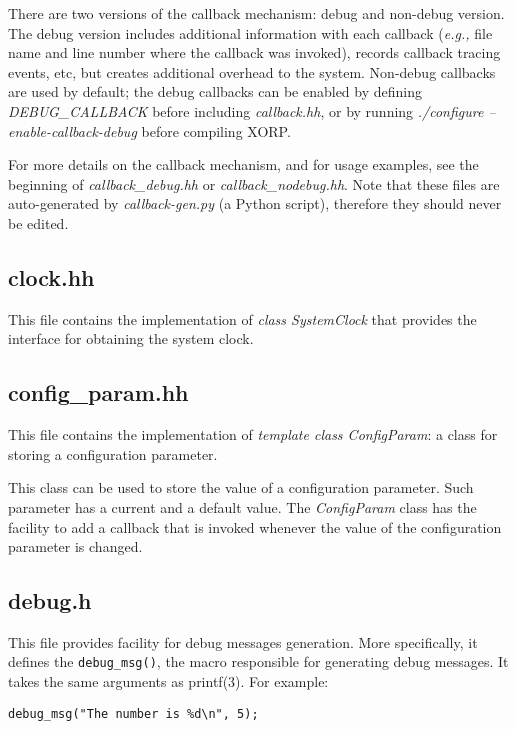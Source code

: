 \documentclass[11pt]{article}
\newcommand{\eg}{\emph{e.g.,}\xspace}
\begin{document}
There are two versions of the callback mechanism: debug and non-debug
version. The debug version includes additional information with
each callback (\eg file name and line number where the callback was invoked),
records callback tracing events, etc, but creates additional overhead
to the system. Non-debug callbacks are used by default; the debug
callbacks can be enabled by defining \emph{DEBUG\_CALLBACK}
before including \emph{callback.hh}, or by running
\emph{./configure --enable-callback-debug} before compiling XORP.

For more details on the callback mechanism, and for usage examples, see
the beginning of \emph{callback\_debug.hh} or \emph{callback\_nodebug.hh}.
Note that these files are auto-generated by \emph{callback-gen.py}
(a Python script), therefore they should never be edited.

\subsection{clock.hh}

This file contains the implementation of \emph{class SystemClock}
that provides the interface for obtaining the system clock.

\subsection{config\_param.hh}

This file contains the implementation of \emph{template class
ConfigParam}: a class for storing a configuration parameter.

This class can be used to store the value of a configuration parameter.
Such parameter has a current and a default value.
The \emph{ConfigParam} class has the facility to add a callback that is
invoked whenever the value of the configuration parameter is changed.

\subsection{debug.h}

This file provides facility for debug messages generation.
More specifically, it defines the \verb=debug_msg()=, the macro
responsible for generating debug messages.
It takes the same arguments as printf(3). For example:

\begin{verbatim}
debug_msg("The number is %d\n", 5);
\end{verbatim}
\end{document}

